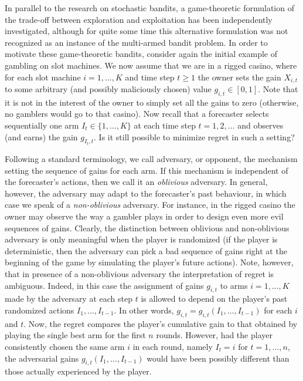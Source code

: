In parallel to the research on stochastic bandits, a game-theoretic formulation of the trade-off between exploration and exploitation has been independently investigated, although for quite some time this alternative formulation was not recognized as an instance of the multi-armed bandit problem. In order to motivate these game-theoretic bandits, consider again the initial example of gambling on slot machines. We now assume that we are in a rigged casino, where for each slot machine $i=1,\hdots,K$ and time step $t \ge 1$ the owner sets the gain $X_{i,t}$ to some arbitrary (and possibly maliciously chosen) value $g_{i,t} \in [0,1]$. Note that it is not in the interest of the owner to simply set all the gains to zero (otherwise, no gamblers would go to that casino). Now recall that a forecaster selects sequentially one arm $I_t \in \{1,\hdots,K\}$ at each time step $t=1,2,\dots$ and observes (and earns) the gain $g_{I_t,t}$. Is it still possible to minimize regret in such a setting?

Following a standard terminology, we call adversary, or opponent, the mechanism setting the sequence of gains for each arm. If this mechanism is independent of the forecaster's actions, then we call it an \textsl{oblivious} adversary. In general, however, the adversary may adapt to the forecaster's past behaviour, in which case we speak of a \textsl{non-oblivious} adversary. For instance, in the rigged casino the owner may observe the way a gambler plays in order to design even more evil sequences of gains.
%
Clearly, the distinction between oblivious and non-oblivious adversary is only meaningful when the player is randomized (if the player is deterministic, then the adversary can pick a bad sequence of gains right at the beginning of the game by simulating the player's future actions). Note, however, that in presence of a non-oblivious adversary the interpretation of regret is ambiguous. Indeed, in this case the assignment of gains $g_{i,t}$ to arms $i=1,\dots,K$ made by the adversary at each step $t$ is allowed to depend on the player's past randomized actions $I_1,\dots,I_{t-1}$. In other words, $g_{i,t} = g_{i,t}(I_1,\dots,I_{t-1})$ for each $i$ and $t$. Now, the regret compares the player's cumulative gain to that obtained by playing the single best arm for the first $n$ rounds. However, had the player consistently chosen the same arm $i$ in each round, namely $I_t = i$ for $t=1,\dots,n$, the adversarial gains $g_{i,t}(I_1,\dots,I_{t-1})$ would have been possibly different than those actually experienced by the player.

